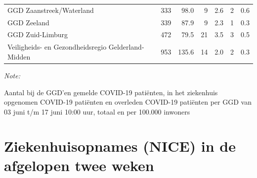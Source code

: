 \documentclass[
  english,
  man,floatsintext]{apa6}
\begin{document}
\begin{table}
\begin{threeparttable}
\begin{tabular}{lrrrrrr}
GGD Zaanstreek/Waterland & 333 & 98.0 & 9 & 2.6 & 2 & 0.6\\
GGD Zeeland & 339 & 87.9 & 9 & 2.3 & 1 & 0.3\\
GGD Zuid-Limburg & 472 & 79.5 & 21 & 3.5 & 3 & 0.5\\
Veiligheids- en Gezondheidsregio Gelderland-Midden & 953 & 135.6 & 14 & 2.0 & 2 & 0.3\\
\bottomrule
\end{tabular}
\begin{tablenotes}
\item \textit{Note: } 
\item Aantal bij de GGD’en gemelde COVID-19 patiënten, in het ziekenhuis opgenomen COVID-19 patiënten en overleden COVID-19 patiënten per GGD van 03 juni t/m 17 juni 10:00 uur, totaal en per 100.000 inwoners
\end{tablenotes}
\end{threeparttable}
\endgroup{}
\end{table}

\newpage

\hypertarget{ziekenhuisopnames-nice-in-de-afgelopen-twee-weken}{%
\section{Ziekenhuisopnames (NICE) in de afgelopen twee weken}\label{ziekenhuisopnames-nice-in-de-afgelopen-twee-weken}}
\end{document}
